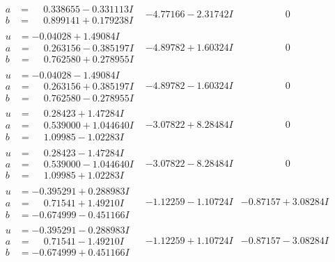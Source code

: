 \documentclass[1p]{elsarticle_modified}
\theoremstyle{definition}
\begin{document}
$$\begin{array}{c|c|c}
\begin{aligned}
a &= \phantom{-}0.338655 - 0.331113 I \\
b &= \phantom{-}0.899141 + 0.179238 I\end{aligned}
 & -4.77166 - 2.31742 I & \phantom{-0.000000 } 0 \\ \hline\begin{aligned}
u &= -0.04028 + 1.49084 I \\
a &= \phantom{-}0.263156 - 0.385197 I \\
b &= \phantom{-}0.762580 + 0.278955 I\end{aligned}
 & -4.89782 + 1.60324 I & \phantom{-0.000000 } 0 \\ \hline\begin{aligned}
u &= -0.04028 - 1.49084 I \\
a &= \phantom{-}0.263156 + 0.385197 I \\
b &= \phantom{-}0.762580 - 0.278955 I\end{aligned}
 & -4.89782 - 1.60324 I & \phantom{-0.000000 } 0 \\ \hline\begin{aligned}
u &= \phantom{-}0.28423 + 1.47284 I \\
a &= \phantom{-}0.539000 + 1.044640 I \\
b &= \phantom{-}1.09985 - 1.02283 I\end{aligned}
 & -3.07822 + 8.28484 I & \phantom{-0.000000 } 0 \\ \hline\begin{aligned}
u &= \phantom{-}0.28423 - 1.47284 I \\
a &= \phantom{-}0.539000 - 1.044640 I \\
b &= \phantom{-}1.09985 + 1.02283 I\end{aligned}
 & -3.07822 - 8.28484 I & \phantom{-0.000000 } 0 \\ \hline\begin{aligned}
u &= -0.395291 + 0.288983 I \\
a &= \phantom{-}0.71541 + 1.49210 I \\
b &= -0.674999 - 0.451166 I\end{aligned}
 & -1.12259 - 1.10724 I & -0.87157 + 3.08284 I \\ \hline\begin{aligned}
u &= -0.395291 - 0.288983 I \\
a &= \phantom{-}0.71541 - 1.49210 I \\
b &= -0.674999 + 0.451166 I\end{aligned}
 & -1.12259 + 1.10724 I & -0.87157 - 3.08284 I \\ \hline\begin{aligned}

\end{aligned}
\end{array}$$
\end{document}
